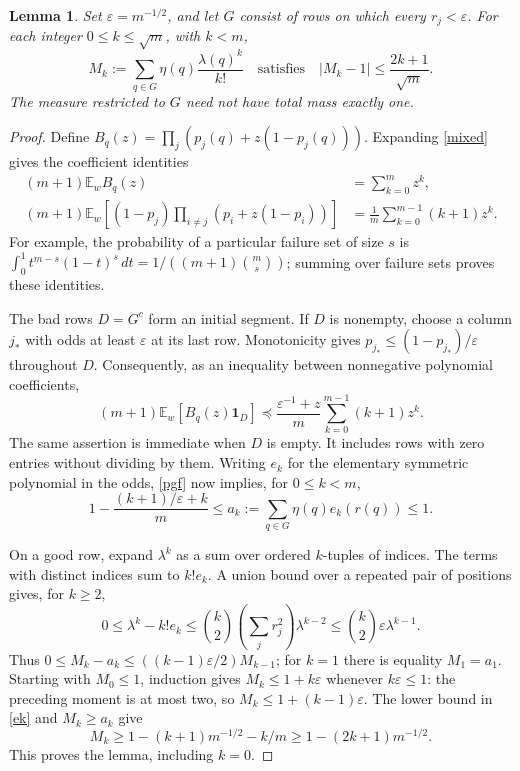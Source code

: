 \documentclass[11pt]{article}
\newtheorem{lemma}[theorem]{Lemma}
\newcommand{\E}{\mathbb E}
\begin{document}
\begin{lemma}\label{moments}
Set $\varepsilon=m^{-1/2}$, and let $G$ consist of rows on which every
$r_j<\varepsilon$. For each integer $0\le k\le\sqrt m$, with $k<m$,
\[
 M_k:=\sum_{q\in G}\eta(q)\frac{\lambda(q)^k}{k!}
 \quad\text{satisfies}\quad
 |M_k-1|\le\frac{2k+1}{\sqrt m}.
\]
The measure restricted to $G$ need not have total mass exactly one.
\end{lemma}
\begin{proof}
Define $B_q(z)=\prod_j(p_j(q)+z(1-p_j(q)))$. Expanding
\eqref{mixed} gives the coefficient identities
\begin{align}
 (m+1)\E_w B_q(z)&=\sum_{k=0}^m z^k,\label{pgf}\\
 (m+1)\E_w\left[(1-p_j)\prod_{i\ne j}
                  (p_i+z(1-p_i))\right]
 &=\frac1m\sum_{k=0}^{m-1}(k+1)z^k.\label{derivative}
\end{align}
For example, the probability of a particular failure set of size $s$
is $\int_0^1 t^{m-s}(1-t)^s\,dt
=1/((m+1)\binom ms)$; summing over failure sets proves these identities.

The bad rows $D=G^c$ form an initial segment. If $D$ is nonempty,
choose a column $j_*$ with odds at least $\varepsilon$ at its last row.
Monotonicity gives $p_{j_*}\le(1-p_{j_*})/\varepsilon$ throughout $D$.
Consequently, as an inequality between nonnegative polynomial
coefficients,
\[
 (m+1)\E_w[B_q(z)\boldsymbol1_D]
 \preceq \frac{\varepsilon^{-1}+z}{m}
                 \sum_{k=0}^{m-1}(k+1)z^k.
\]
The same assertion is immediate when $D$ is empty. It includes rows
with zero entries without dividing by them.
Writing $e_k$ for the elementary symmetric polynomial in the odds,
\eqref{pgf} now implies, for $0\le k<m$,
\begin{equation}\label{ek}
 1-\frac{(k+1)/\varepsilon+k}{m}
 \le a_k:=\sum_{q\in G}\eta(q)e_k(r(q))\le1.
\end{equation}

On a good row, expand $\lambda^k$ as a sum over ordered $k$-tuples
of indices. The terms with distinct indices sum to $k!e_k$.
A union bound over a repeated pair of positions gives, for $k\ge2$,
\[
 0\le\lambda^k-k!e_k
 \le\binom{k}{2}\left(\sum_jr_j^2\right)\lambda^{k-2}
 \le\binom{k}{2}\varepsilon\lambda^{k-1}.
\]
Thus $0\le M_k-a_k\le((k-1)\varepsilon/2)M_{k-1}$; for $k=1$
there is equality $M_1=a_1$. Starting with $M_0\le1$, induction gives
$M_k\le1+k\varepsilon$ whenever $k\varepsilon\le1$: the preceding
moment is at most two, so $M_k\le1+(k-1)\varepsilon$.
The lower bound in \eqref{ek} and $M_k\ge a_k$ give
\[
 M_k\ge1-(k+1)m^{-1/2}-k/m\ge1-(2k+1)m^{-1/2}.
\]
This proves the lemma, including $k=0$.
\end{proof}
\end{document}
